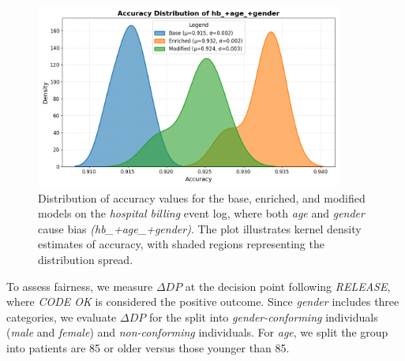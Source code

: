 \begin{figure}[h!]
    \centering
    \includegraphics[width=0.9\textwidth]{gfx/hb_accuracy.png}
    \caption{Distribution of accuracy values for the base, enriched, and modified models on the \textit{hospital billing} event log,
    where both \textit{age} and \textit{gender} cause bias \textit{(hb\_+age\_+gender)}.
    The plot illustrates kernel density estimates of accuracy, with shaded regions representing the distribution spread.}
    \label{fig:hb_accuracy}
\end{figure}

To assess fairness, we measure \(\Delta \textit{DP}\) at the decision point following \textit{RELEASE},
where \textit{CODE OK} is considered the positive outcome.
Since \textit{gender} includes three categories,
we evaluate \(\Delta \textit{DP}\) for the split into \textit{gender-conforming} individuals (\textit{male} and \textit{female})
and \textit{non-conforming} individuals.
For \textit{age}, we split the group into patients are 85 or older versus those younger than 85.

